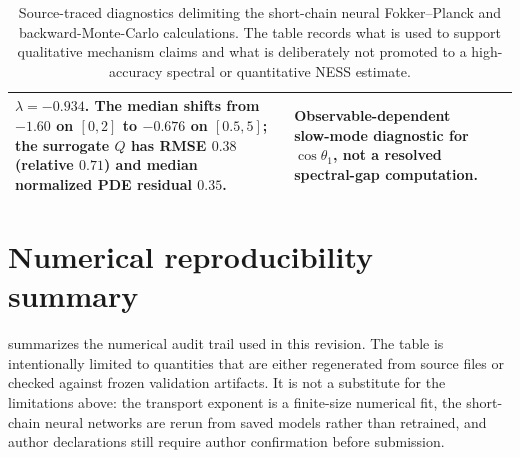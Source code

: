 \documentclass[11pt,a4paper]{article}
\theoremstyle{definition}
\numberwithin{equation}{section}   %
\begin{document}
\begin{table}[ht]
\begin{tabular}{>{\raggedright\arraybackslash}p{}
                >{\raggedright\arraybackslash}p{}
                >{\raggedright\arraybackslash}p{}}
$\lambda=-0.934$. The median shifts from $-1.60$ on $[0,2]$ to $-0.676$ on
$[0.5,5]$; the surrogate $Q$ has RMSE $0.38$ (relative $0.71$) and median
normalized PDE residual $0.35$. &
Observable-dependent slow-mode diagnostic for $\cos\theta_1$, not a resolved
spectral-gap computation. \\
\bottomrule
\end{tabular}
\caption{Source-traced diagnostics delimiting the short-chain neural
Fokker--Planck and backward-Monte-Carlo calculations. The table records what is
used to support qualitative mechanism claims and what is deliberately not
promoted to a high-accuracy spectral or quantitative NESS estimate.}
\label{tab:short-chain-diagnostics}
\end{table}

\section*{Numerical reproducibility summary}

 summarizes the numerical audit trail used in this
revision. The table is intentionally limited to quantities that are either
regenerated from source files or checked against frozen validation artifacts.
It is not a substitute for the limitations above: the transport exponent is a
finite-size numerical fit, the short-chain neural networks are rerun from saved
models rather than retrained, and author declarations still require author
confirmation before submission.
\end{document}
